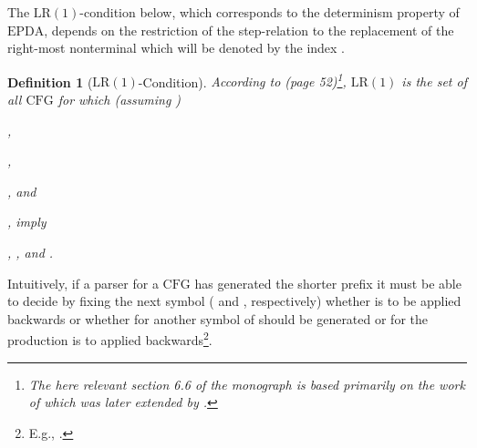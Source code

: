 \documentclass[draft]{ifacconf}
\newtheorem{definition}{Definition}
\newcommand{\CFG}{\ensuremath{\mathrm{CFG}}\xspace}
\newcommand{\LR}[1][1]{\ensuremath{\mathrm{LR}(#1)}\xspace}
\newcommand{\EPDA}{\ensuremath{\mathrm{EPDA}}\xspace}
\begin{document}
The \LR-condition below, which corresponds to the determinism property of \EPDA, depends on the restriction of the step-relation to the replacement of the right-most nonterminal which will be denoted by the index .
\begin{definition}[\LR-Condition]
According to \cite{sippu-2} (page 52)\footnote{The here relevant section 6.6 of the monograph \cite{sippu-2} is based primarily on the work of \cite{DBLP:journals/iandc/Knuth65} which was later extended by \cite{Aho:1972:TPT:578789}.}, \LR is the set of all \CFG for which (assuming )\\
\begin{inparaenum}[(i)]
\item ,\\
\item ,\\
\item , and\\
\item , imply\\
\item , , and .
\end{inparaenum}
\end{definition}
Intuitively, if a parser for a \CFG has generated the shorter prefix  it must be able to decide by fixing the next symbol ( and , respectively) whether  is to be applied backwards or whether for  another symbol of  should be generated or for  the production  is to applied backwards\footnote{E.g., .}.
\end{document}
